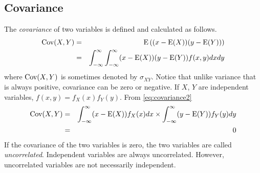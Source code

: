 \subsection{Covariance}

The \textit{covariance} of two variables is defined and calculated as follows.
\begin{eqnarray}
  \textup{Cov}(X, Y) &=& \textup{E}\left((x - \textup{E}(X))(y - \textup{E}(Y))\right) \label{eq:covariance1} \\
  &=& \int_{-\infty}^{\infty}\int_{-\infty}^{\infty}(x - \textup{E}(X))(y - \textup{E}(Y))f(x, y)dxdy \label{eq:covariance2}
\end{eqnarray}
where $\textup{Cov}(X, Y)$ is sometimes denoted by $\sigma_{XY}$. Notice that unlike variance that is always positive, covariance can be zero or negative. If $X$, $Y$ are independent variables, $f(x,y) = f_X(x)f_Y(y)$. From \eqref{eq:covariance2}
\begin{eqnarray}
   \textup{Cov}(X, Y) &=& \int_{-\infty}^{\infty}(x - \textup{E}(X))f_X(x)dx \times \int_{-\infty}^{\infty}(y - \textup{E}(Y))f_Y(y)dy \nonumber \\
   &=& 0 \nonumber
\end{eqnarray}
If the covariance of the two variables is zero, the two variables are called \textit{uncorrelated}. Independent variables are always uncorrelated. However, uncorrelated variables are not necessarily independent.

